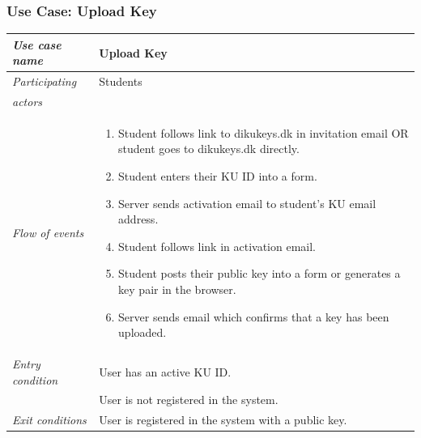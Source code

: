 \documentclass[11pt,a4paper]{report}
\begin{document}
\subsubsection{Use Case: Upload Key}
\begin{tabular}{l p{}}
    \toprule
    \textit{Use case name} & Upload Key \\
    \midrule
    \textit{Participating} & Students \\
    \textit{actors} & \\
    \midrule
    \textit{Flow of events} &
    \vspace{-6.7mm} \begin{enumerate}
        \item Student follows link to dikukeys.dk in invitation email OR student goes to dikukeys.dk directly.
        \item Student enters their KU ID into a form.
        \item Server sends activation email to student's KU email address.
        \item Student follows link in activation email.
        \item Student posts their public key into a form or generates a key pair in the browser.
        \item Server sends email which confirms that a key has been uploaded.
    \end{enumerate}
    \\
    \midrule
    \textit{Entry condition} & User has an active KU ID. \\
                             & User is not registered in the system. \\
    \midrule
    \textit{Exit conditions} & User is registered in the system with a public key. \\
    \bottomrule
\end{tabular}
\end{document}
